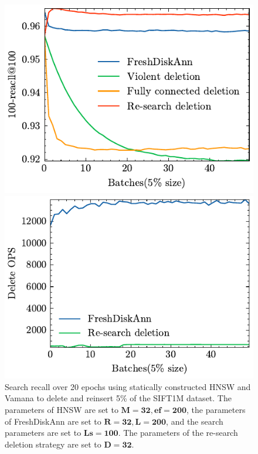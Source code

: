 \begin{figure}[h]
	\centering
	\begin{minipage}{0.49\linewidth}
		\centering
		\vspace{3pt}
		\includegraphics[width=\textwidth]{fig/Result/SIFT1M/SamplePolicy_FreshDiskAnn_recall.pdf}
	\end{minipage}
	\begin{minipage}{0.49\linewidth}
		\centering
		\vspace{3pt}
		\includegraphics[width=\textwidth]{fig/Result/SIFT1M/SamplePolicy__delete_OPS.pdf}
	\end{minipage}
	\caption{Search recall over 20 epochs using statically constructed HNSW and Vamana to delete and reinsert 5\% of the SIFT1M dataset. The parameters of HNSW are set to $\mathbf{M=32, ef=200}$, the parameters of FreshDiskAnn are set to $\mathbf{R=32, L=200}$, and the search parameters are set to $\mathbf{Ls=100}$. The parameters of the re-search deletion strategy are set to $\mathbf{D=32}$.}
	\label{SamplePolicy}
\end{figure}

